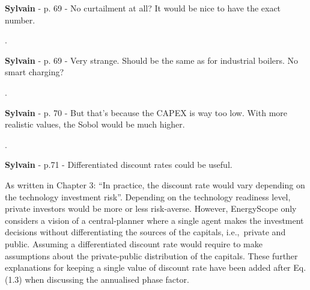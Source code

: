 \documentclass[12pt,a4paper]{article}
\def\ie{i.e.,\ }
\begin{document}
\begin{mdframed}[style=comment] %
{\color{purple} \textbf{Sylvain}} - p. 69 - No curtailment at all? It would be nice to have the exact number.
\end{mdframed}

\noindent {\color{blue} }. 

\begin{mdframed}[style=manuscript] %

\end{mdframed}

\begin{mdframed}[style=comment] %
{\color{purple} \textbf{Sylvain}} - p. 69 - Very strange. Should be the same as for industrial boilers. No smart charging?
\end{mdframed}

\noindent {\color{blue} }. 

\begin{mdframed}[style=manuscript] %

\end{mdframed}

\begin{mdframed}[style=comment] %
{\color{purple} \textbf{Sylvain}} - p. 70 - But that's because the CAPEX is way too low. With more realistic values, the Sobol would be much higher.
\end{mdframed}

\noindent {\color{blue} }. 

\begin{mdframed}[style=manuscript] %

\end{mdframed}

\begin{mdframed}[style=comment] %
{\color{purple} \textbf{Sylvain}} - p.71 - Differentiated discount rates could be useful.
\end{mdframed}

\noindent As written in Chapter 3: ``In practice, the discount rate would vary depending on the technology investment risk''. Depending on the technology readiness level, private investors would be more or less risk-averse. However, EnergyScope only considers a vision of a central-planner where a single agent makes the investment decisions without differentiating the sources of the capitals, \ie private and public. Assuming a differentiated discount rate would require to make assumptions about the private-public distribution of the capitals. These further explanations for keeping a single value of discount rate have been added {\color{blue} after Eq. (1.3) when discussing the annualised phase factor}.
\end{document}

